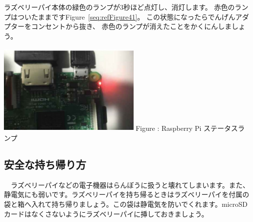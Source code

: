 \documentclass[a4paper,12pt]{jarticle}
\begin{document}
\bigskip
\flushleft
\textcolor[rgb]{0.13333334,0.13333334,0.13333334}{ラズベリーパイ本体の緑色のランプが3秒ほど点灯し、消灯します。
  赤色のランプはついたままですFigure~\ref{seq:refFigure41}。
  この状態になったらでんげんアダプターをコンセントから抜き、
  赤色のランプが消えたことをかくにんしましょう。}

\bigskip
\centering
\begin{minipage}{8.207cm}
  {\upshape
    \includegraphics[width=7.0cm,height=4.5cm]{textbook-img207.jpg}
    \newline
    Figure {\theFigure\label{seq:refFigure41}}: Raspberry Pi
    ステータスランプ}
\end{minipage}
\clearpage\subsection{安全な持ち帰り方}
\flushleft
\ \ ラズベリーパイなどの電子機器はらんぼうに扱うと壊れてしまいます。また、静電気にも弱いです。ラズベリーパイを持ち帰るときはラズベリーパイを付属の袋と箱へ入れて持ち帰りましょう。この袋は静電気を防いでくれます。microSDカードはなくさないようにラズベリーパイに挿しておきましょう。

\clearpage
\end{document}
